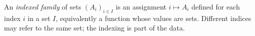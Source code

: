 
An \emph{indexed family} of sets $(A_i)_{i\in I}$ is an assignment $i\mapsto A_i$ defined for each index $i$ in a set $I$, equivalently a function whose values are sets. Different indices may refer to the same set; the indexing is part of the data.
